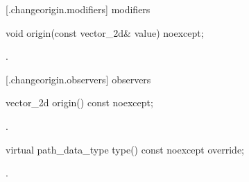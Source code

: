  [\iotwod.changeorigin.modifiers]{ modifiers}

\begin{itemdecl}
    void origin(const vector_2d& value) noexcept;
\end{itemdecl}
\begin{itemdescr}
	\pnum
	\postconditions
	.
	
\end{itemdescr}

 [\iotwod.changeorigin.observers]{ observers}

\begin{itemdecl}
    vector_2d origin() const noexcept;
\end{itemdecl}
\begin{itemdescr}
	\pnum
	\returns
	.

\end{itemdescr}

\begin{itemdecl}
    virtual path_data_type type() const noexcept override;
\end{itemdecl}
\begin{itemdescr}
	\pnum
	\returns
	.

\end{itemdescr}
